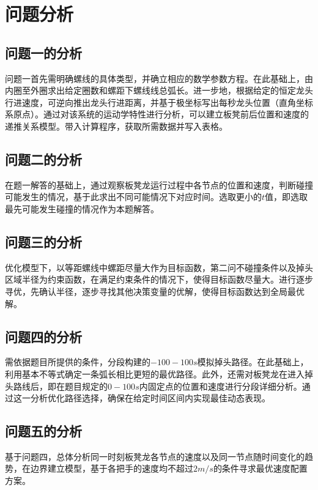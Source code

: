 \documentclass[withoutpreface,bwprint]{cumcmthesis}
\begin{document}

\section{问题分析}
\subsection{问题一的分析}
问题一首先需明确螺线的具体类型，并确立相应的数学参数方程。在此基础上，由内圈至外圈求出给定圈数和螺距下螺线线总弧长。进一步地，根据给定的恒定龙头行进速度，可逆向推出龙头行进距离，并基于极坐标写出每秒龙头位置（直角坐标系原点）。通过对该系统的运动学特性进行分析，可以建立板凳前后位置和速度的递推关系模型。带入计算程序，获取所需数据并写入表格。

\subsection{问题二的分析}
在题一解答的基础上，通过观察板凳龙运行过程中各节点的位置和速度，判断碰撞可能发生的情况，基于此求出不同可能情况下对应时间。选取更小的$t$值，即选取最先可能发生碰撞的情况作为本题解答。

\subsection{问题三的分析}
优化模型下，以等距螺线中螺距尽量大作为目标函数，第二问不碰撞条件以及掉头区域半径为约束函数，在满足约束条件的情况下，使得目标函数尽量大。进行逐步寻优，先确认半径，逐步寻找其他决策变量的优解，使得目标函数达到全局最优解。
 
\subsection{问题四的分析}
需依据题目所提供的条件，分段构建的$-100-100s$模拟掉头路径。在此基础上，利用基本不等式确定一条弧长相比更短的最优路径。此外，还需对板凳龙在进入掉头路线后，即在题目规定的$0-100s$内固定点的位置和速度进行分段详细分析。通过这一分析优化路径选择，确保在给定时间区间内实现最佳动态表现。

\subsection{问题五的分析}
基于问题四，总体分析同一时刻板凳龙各节点的速度以及同一节点随时间变化的趋势，在边界建立模型，基于各把手的速度均不超过$2m/s$的条件寻求最优速度配置方案。
\end{document}
